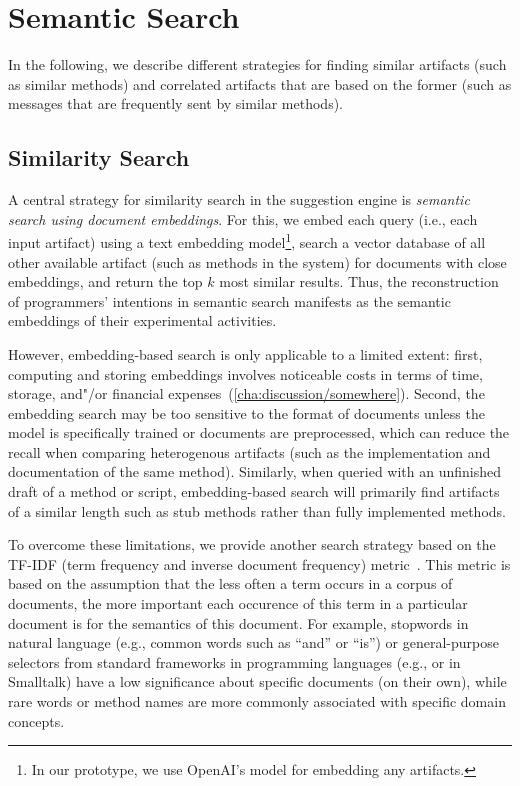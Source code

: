 
\section{Semantic Search}
\label{sec:suggestions/search}

In the following, we describe different strategies for finding similar artifacts (such as similar methods) and correlated artifacts that are based on the former (such as messages that are frequently sent by similar methods).

\subsection{Similarity Search}
\label{sec:suggestions/search/similar}

A central strategy for similarity search in the suggestion engine is \emph{semantic search using document embeddings}.
For this, we embed each query (i.e., each input artifact) using a text embedding model\footnote{In our prototype, we use OpenAI's  model for embedding any artifacts.}, search a vector database of all other available artifact (such as methods in the system) for documents with close embeddings, and return the top $k$ most similar results.
Thus, the reconstruction of programmers' intentions in semantic search manifests as the semantic embeddings of their experimental activities.

However, embedding-based search is only applicable to a limited extent:
first, computing and storing embeddings involves noticeable costs in terms of time, storage, and"/or financial expenses~(\cref{cha:discussion/somewhere}).
Second, the embedding search may be too sensitive to the format of documents unless the model is specifically trained or documents are preprocessed, which can reduce the recall when comparing heterogenous artifacts (such as the implementation and documentation of the same method).
Similarly, when queried with an unfinished draft of a method or script, embedding-based search will primarily find artifacts of a similar length such as stub methods rather than fully implemented methods.

To overcome these limitations, we provide another search strategy based on the TF-IDF (term frequency and inverse document frequency) metric~\cite{salton1988term}.
This metric is based on the assumption that the less often a term occurs in a corpus of documents, the more important each occurence of this term in a particular document is for the semantics of this document.
For example, stopwords in natural language (e.g., common words such as ``and'' or ``is'') or general-purpose selectors from standard frameworks in programming languages (e.g.,  or  in Smalltalk) have a low significance about specific documents (on their own), while rare words or method names are more commonly associated with specific domain concepts.

